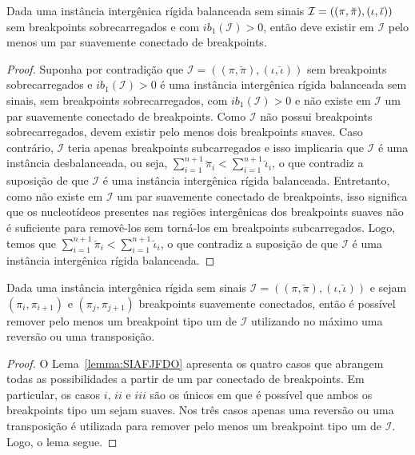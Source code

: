 \begin{lemma}\label{lemma:GZNXMCLB}
Dada uma instância intergênica rígida balanceada sem sinais $\mathcal{I}=((\pi,\breve\pi),\break(\iota,\breve\iota))$ sem breakpoints sobrecarregados e com $ib_1(\mathcal{I}) > 0$, então deve existir em $\mathcal{I}$ pelo menos um par suavemente conectado de breakpoints.
\end{lemma}
\begin{proof}
Suponha por contradição que $\mathcal{I}=((\pi,\breve\pi),(\iota,\breve\iota))$ sem breakpoints sobrecarregados e $ib_1(\mathcal{I}) > 0$ é uma instância intergênica rígida balanceada sem sinais, sem breakpoints sobrecarregados, com $ib_1(\mathcal{I}) > 0$ e não existe em  $\mathcal{I}$ um par suavemente conectado de breakpoints. Como $\mathcal{I}$ não possui breakpoints sobrecarregados, devem existir pelo menos dois breakpoints suaves. Caso contrário, $\mathcal{I}$ teria apenas breakpoints subcarregados e isso implicaria que $\mathcal{I}$ é uma instância desbalanceada, ou seja, $\sum_{i=1}^{n+1}\breve\pi_i < \sum_{i=1}^{n+1}\breve\iota_i$, o que contradiz a suposição de que $\mathcal{I}$ é uma instância intergênica rígida balanceada. Entretanto, como não existe em  $\mathcal{I}$ um par suavemente conectado de breakpoints, isso significa que os nucleotídeos presentes nas regiões intergênicas dos breakpoints suaves não é suficiente para removê-los sem torná-los em breakpoints subcarregados. Logo, temos que $\sum_{i=1}^{n+1}\breve\pi_i < \sum_{i=1}^{n+1}\breve\iota_i$, o que contradiz a suposição de que $\mathcal{I}$ é uma instância intergênica rígida balanceada.
\end{proof}

\begin{lemma}\label{lemma:LRCEAVRZ}
Dada uma instância intergênica rígida sem sinais $\mathcal{I}=((\pi,\breve\pi),(\iota,\breve\iota))$ e sejam $(\pi_i,\pi_{i+1})$ e $(\pi_j,\pi_{j+1})$ breakpoints suavemente conectados, então é possível remover pelo menos um breakpoint tipo um de $\mathcal{I}$ utilizando no máximo uma reversão ou uma transposição.
\end{lemma}
\begin{proof}
O Lema~\ref{lemma:SIAFJFDO} apresenta os quatro casos que abrangem todas as possibilidades a partir de um par conectado de breakpoints. Em particular, os casos $i$, $ii$ e $iii$ são os únicos em que é possível que ambos os breakpoints tipo um sejam suaves. Nos três casos apenas uma reversão ou uma transposição é utilizada para remover pelo menos um breakpoint tipo um de $\mathcal{I}$. Logo, o lema segue.
\end{proof}

